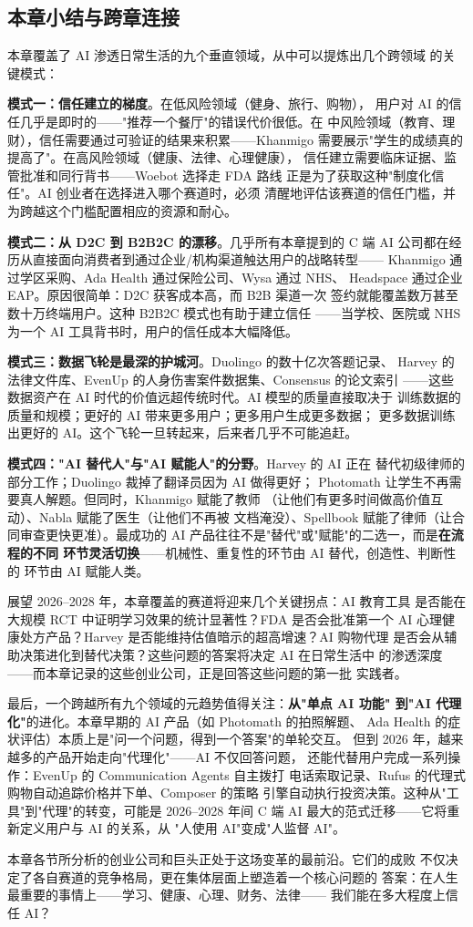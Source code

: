 \subsection*{本章小结与跨章连接}

本章覆盖了 AI 渗透日常生活的九个垂直领域，从中可以提炼出几个跨领域
的关键模式：

\textbf{模式一：信任建立的梯度}。在低风险领域（健身、旅行、购物），
用户对 AI 的信任几乎是即时的——"推荐一个餐厅"的错误代价很低。在
中风险领域（教育、理财），信任需要通过可验证的结果来积累——Khanmigo
需要展示"学生的成绩真的提高了"。在高风险领域（健康、法律、心理健康），
信任建立需要临床证据、监管批准和同行背书——Woebot 选择走 FDA 路线
正是为了获取这种"制度化信任"。AI 创业者在选择进入哪个赛道时，必须
清醒地评估该赛道的信任门槛，并为跨越这个门槛配置相应的资源和耐心。

\textbf{模式二：从 D2C 到 B2B2C 的漂移}。几乎所有本章提到的 C 端 AI
公司都在经历从直接面向消费者到通过企业/机构渠道触达用户的战略转型——
Khanmigo 通过学区采购、Ada Health 通过保险公司、Wysa 通过 NHS、
Headspace 通过企业 EAP。原因很简单：D2C 获客成本高，而 B2B 渠道一次
签约就能覆盖数万甚至数十万终端用户。这种 B2B2C 模式也有助于建立信任
——当学校、医院或 NHS 为一个 AI 工具背书时，用户的信任成本大幅降低。

\textbf{模式三：数据飞轮是最深的护城河}。Duolingo 的数十亿次答题记录、
Harvey 的法律文件库、EvenUp 的人身伤害案件数据集、Consensus 的论文索引
——这些数据资产在 AI 时代的价值远超传统时代。AI 模型的质量直接取决于
训练数据的质量和规模；更好的 AI 带来更多用户；更多用户生成更多数据；
更多数据训练出更好的 AI。这个飞轮一旦转起来，后来者几乎不可能追赶。

\textbf{模式四："AI 替代人"与"AI 赋能人"的分野}。Harvey 的 AI 正在
替代初级律师的部分工作；Duolingo 裁掉了翻译员因为 AI 做得更好；
Photomath 让学生不再需要真人解题。但同时，Khanmigo 赋能了教师
（让他们有更多时间做高价值互动）、Nabla 赋能了医生（让他们不再被
文档淹没）、Spellbook 赋能了律师（让合同审查更快更准）。最成功的
AI 产品往往不是"替代"或"赋能"的二选一，而是\textbf{在流程的不同
环节灵活切换}——机械性、重复性的环节由 AI 替代，创造性、判断性的
环节由 AI 赋能人类。

展望 2026--2028 年，本章覆盖的赛道将迎来几个关键拐点：AI 教育工具
是否能在大规模 RCT 中证明学习效果的统计显著性？FDA 是否会批准第一个
AI 心理健康处方产品？Harvey 是否能维持估值暗示的超高增速？AI 购物代理
是否会从辅助决策进化到替代决策？这些问题的答案将决定 AI 在日常生活中
的渗透深度——而本章记录的这些创业公司，正是回答这些问题的第一批
实践者。

最后，一个跨越所有九个领域的元趋势值得关注：\textbf{从"单点 AI 功能"
到"AI 代理化"}的进化。本章早期的 AI 产品（如 Photomath 的拍照解题、
Ada Health 的症状评估）本质上是"问一个问题，得到一个答案"的单轮交互。
但到 2026 年，越来越多的产品开始走向"代理化"——AI 不仅回答问题，
还能代替用户完成一系列操作：EvenUp 的 Communication Agents 自主拨打
电话索取记录、Rufus 的代理式购物自动追踪价格并下单、Composer 的策略
引擎自动执行投资决策。这种从"工具"到"代理"的转变，可能是 2026--2028
年间 C 端 AI 最大的范式迁移——它将重新定义用户与 AI 的关系，从
"人使用 AI"变成"人监督 AI"。

本章各节所分析的创业公司和巨头正处于这场变革的最前沿。它们的成败
不仅决定了各自赛道的竞争格局，更在集体层面上塑造着一个核心问题的
答案：在人生最重要的事情上——学习、健康、心理、财务、法律——
我们能在多大程度上信任 AI？
